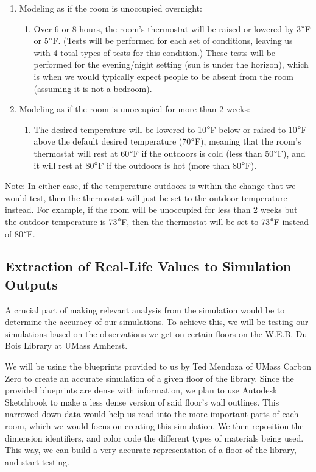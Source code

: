 \documentclass[conference,letterpaper]{IEEEtran}
\begin{document}
\begin{enumerate}
    \item Modeling as if the room is unoccupied overnight:
    \begin{enumerate}
        \item Over 6 or 8 hours, the room's thermostat will be raised or lowered by 3$\degree$F or 5$\degree$F. (Tests will be performed for each set of conditions, leaving us with 4 total types of tests for this condition.) These tests will be performed for the evening/night setting (sun is under the horizon), which is when we would typically expect people to be absent from the room (assuming it is not a bedroom).
    \end{enumerate}
    \item Modeling as if the room is unoccupied for more than 2 weeks:
    \begin{enumerate}
        \item The desired temperature will be lowered to 10$\degree$F below or raised to 10$\degree$F above the default desired temperature (70$\degree$F), meaning that the room's thermostat will rest at 60$\degree$F if the outdoors is cold (less than 50$\degree$F), and it will rest at 80$\degree$F if the outdoors is hot (more than 80$\degree$F). \cite{ambient}
    \end{enumerate}
\end{enumerate}

Note: In either case, if the temperature outdoors is within the change that we would test, then the thermostat will just be set to the outdoor temperature instead. For example, if the room will be unoccupied for less than 2 weeks but the outdoor temperature is 73$\degree$F, then the thermostat will be set to 73$\degree$F instead of 80$\degree$F.

\subsection{Extraction of Real-Life Values to Simulation Outputs}

A crucial part of making relevant analysis from the simulation would be to determine the accuracy of our simulations. To achieve this, we will be testing our simulations based on the observations we get on certain floors on the W.E.B. Du Bois Library at UMass Amherst. 

We will be using the blueprints provided to us by Ted Mendoza of UMass Carbon Zero to create an accurate simulation of a given floor of the library. Since the provided blueprints are dense with information, we plan to use Autodesk Sketchbook to make a less dense version of said floor's wall outlines. This narrowed down data would help us read into the more important parts of each room, which we would focus on creating this simulation. We then reposition the dimension identifiers, and color code the different types of materials being used. This way, we can build a very accurate representation of a floor of the library, and start testing. 
\end{document}
